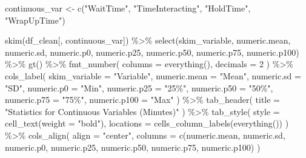 \documentclass[
  letterpaper,
  DIV=11,
  numbers=noendperiod]{scrartcl}
\newenvironment{Shaded}{\begin{snugshade}}{\end{snugshade}}
\newcommand{\AttributeTok}[1]{\textcolor[rgb]{0.40,0.45,0.13}{#1}}
\newcommand{\DecValTok}[1]{\textcolor[rgb]{0.68,0.00,0.00}{#1}}
\newcommand{\FunctionTok}[1]{\textcolor[rgb]{0.28,0.35,0.67}{#1}}
\newcommand{\NormalTok}[1]{\textcolor[rgb]{0.00,0.23,0.31}{#1}}
\newcommand{\OtherTok}[1]{\textcolor[rgb]{0.00,0.23,0.31}{#1}}
\newcommand{\SpecialCharTok}[1]{\textcolor[rgb]{0.37,0.37,0.37}{#1}}
\newcommand{\StringTok}[1]{\textcolor[rgb]{0.13,0.47,0.30}{#1}}
\begin{document}
\begin{Shaded}
\begin{Highlighting}[]
\NormalTok{continuous\_var }\OtherTok{\textless{}{-}} \FunctionTok{c}\NormalTok{(}\StringTok{"WaitTime"}\NormalTok{, }\StringTok{"TimeInteracting"}\NormalTok{, }\StringTok{"HoldTime"}\NormalTok{, }\StringTok{"WrapUpTime"}\NormalTok{)}

\FunctionTok{skim}\NormalTok{(df\_clean[, continuous\_var]) }\SpecialCharTok{\%\textgreater{}\%}
  \FunctionTok{select}\NormalTok{(skim\_variable, numeric.mean, numeric.sd, numeric.p0, numeric.p25, numeric.p50, numeric.p75, numeric.p100) }\SpecialCharTok{\%\textgreater{}\%}
  \FunctionTok{gt}\NormalTok{() }\SpecialCharTok{\%\textgreater{}\%}
  \FunctionTok{fmt\_number}\NormalTok{(}
    \AttributeTok{columns =} \FunctionTok{everything}\NormalTok{(),}
    \AttributeTok{decimals =} \DecValTok{2}
\NormalTok{  ) }\SpecialCharTok{\%\textgreater{}\%}
  \FunctionTok{cols\_label}\NormalTok{(}
    \AttributeTok{skim\_variable =} \StringTok{"Variable"}\NormalTok{,}
    \AttributeTok{numeric.mean =} \StringTok{"Mean"}\NormalTok{, }
    \AttributeTok{numeric.sd =} \StringTok{"SD"}\NormalTok{, }
    \AttributeTok{numeric.p0 =} \StringTok{"Min"}\NormalTok{, }
    \AttributeTok{numeric.p25 =} \StringTok{"25\%"}\NormalTok{, }
    \AttributeTok{numeric.p50 =} \StringTok{"50\%"}\NormalTok{, }
    \AttributeTok{numeric.p75 =} \StringTok{"75\%"}\NormalTok{, }
    \AttributeTok{numeric.p100 =} \StringTok{"Max"}
\NormalTok{  ) }\SpecialCharTok{\%\textgreater{}\%}
  \FunctionTok{tab\_header}\NormalTok{(}
    \AttributeTok{title =} \StringTok{"Statistics for Continuous Variables (Minutes)"}
\NormalTok{  ) }\SpecialCharTok{\%\textgreater{}\%}
  \FunctionTok{tab\_style}\NormalTok{(}
    \AttributeTok{style =} \FunctionTok{cell\_text}\NormalTok{(}\AttributeTok{weight =} \StringTok{"bold"}\NormalTok{),}
    \AttributeTok{locations =} \FunctionTok{cells\_column\_labels}\NormalTok{(}\FunctionTok{everything}\NormalTok{())}
\NormalTok{  ) }\SpecialCharTok{\%\textgreater{}\%}
  \FunctionTok{cols\_align}\NormalTok{(}
    \AttributeTok{align =} \StringTok{"center"}\NormalTok{, }
    \AttributeTok{columns =} \FunctionTok{c}\NormalTok{(numeric.mean, numeric.sd, numeric.p0, numeric.p25, numeric.p50, numeric.p75, numeric.p100)}
\NormalTok{  )}
\end{Highlighting}
\end{Shaded}
\end{document}
